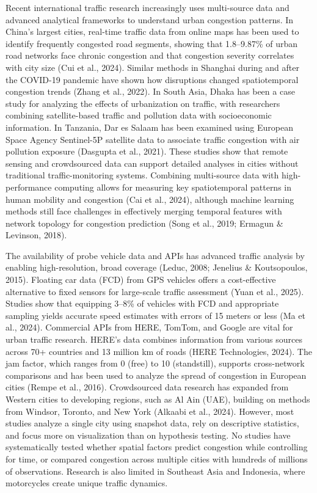 \documentclass[12pt,a4paper]{article}
\begin{document}
Recent international traffic research increasingly uses multi-source data and advanced analytical frameworks to understand urban congestion patterns. In China’s largest cities, real-time traffic data from online maps has been used to identify frequently congested road segments, showing that 1.8–9.87\% of urban road networks face chronic congestion and that congestion severity correlates with city size (Cui et al., 2024). Similar methods in Shanghai during and after the COVID-19 pandemic have shown how disruptions changed spatiotemporal congestion trends (Zhang et al., 2022). In South Asia, Dhaka has been a case study for analyzing the effects of urbanization on traffic, with researchers combining satellite-based traffic and pollution data with socioeconomic information. In Tanzania, Dar es Salaam has been examined using European Space Agency Sentinel-5P satellite data to associate traffic congestion with air pollution exposure (Dasgupta et al., 2021). These studies show that remote sensing and crowdsourced data can support detailed analyses in cities without traditional traffic-monitoring systems. Combining multi-source data with high-performance computing allows for measuring key spatiotemporal patterns in human mobility and congestion (Cai et al., 2024), although machine learning methods still face challenges in effectively merging temporal features with network topology for congestion prediction (Song et al., 2019; Ermagun \& Levinson, 2018).

The availability of probe vehicle data and APIs has advanced traffic analysis by enabling high-resolution, broad coverage (Leduc, 2008; Jenelius \& Koutsopoulos, 2015). Floating car data (FCD) from GPS vehicles offers a cost-effective alternative to fixed sensors for large-scale traffic assessment (Yuan et al., 2025). Studies show that equipping 3–8\% of vehicles with FCD and appropriate sampling yields accurate speed estimates with errors of 15 meters or less (Ma et al., 2024). Commercial APIs from HERE, TomTom, and Google are vital for urban traffic research. HERE’s data combines information from various sources across 70+ countries and 13 million km of roads (HERE Technologies, 2024). The jam factor, which ranges from 0 (free) to 10 (standstill), supports cross-network comparisons and has been used to analyze the spread of congestion in European cities (Rempe et al., 2016). Crowdsourced data research has expanded from Western cities to developing regions, such as Al Ain (UAE), building on methods from Windsor, Toronto, and New York (Alkaabi et al., 2024). However, most studies analyze a single city using snapshot data, rely on descriptive statistics, and focus more on visualization than on hypothesis testing. No studies have systematically tested whether spatial factors predict congestion while controlling for time, or compared congestion across multiple cities with hundreds of millions of observations. Research is also limited in Southeast Asia and Indonesia, where motorcycles create unique traffic dynamics.
\end{document}
